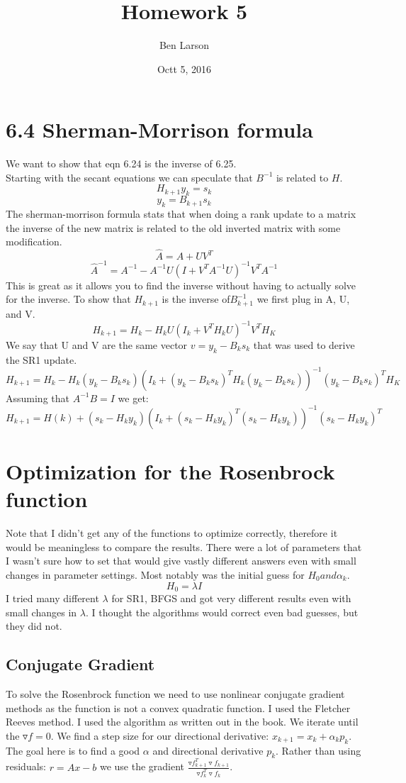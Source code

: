 \documentclass[7pt]{article}
\author{Ben Larson}
\title{Homework 5 }
\date{Octt 5, 2016}
\begin{document}
	\maketitle
	\section{6.4 Sherman-Morrison formula}
	We want to show that eqn 6.24 is the inverse of 6.25.\\
	Starting with the secant equations we can speculate that $B^{-1}$ is related to $ H$. 
	$$ H_{k+1}y_k=s_k $$
	$$ y_k = B_{k+1}s_k$$The sherman-morrison formula stats that when doing a rank update to a matrix the inverse of the new matrix is related to the old inverted matrix with some modification.
	$$\hat{A} = A+UV^T $$
	$$ \hat{A}^{-1} = A^{-1}-A^{-1}U(I+V^TA^{-1}U)^{-1}V^TA^{-1} $$
	 This is great as it allows you to find the inverse without having to actually solve for the inverse.  To show that $H_{k+1} $ is the inverse of$ B^{-1}_{k+1}$ we first plug in A, U, and V. 
	 $$ H_{k+1} = H_k -H_kU(I_k+V^TH_kU)^{-1}V^TH_K$$
	 We say that U and V are the same vector $v=y_k-B_ks_k$ that was used to derive the SR1 update. 
	 $$ H_{k+1} = H_k -H_k(y_k-B_ks_k)(I_k+(y_k-B_ks_k)^TH_k(y_k-B_ks_k))^{-1}(y_k-B_ks_k)^TH_K$$
	 Assuming that $A^{-1}B = I$ we get: 
	 $$ H_{k+1}=H(k)+(s_k-H_ky_k)(I_k+(s_k-H_ky_k)^T(s_k-H_ky_k))^{-1}(s_k-H_ky_k)^T $$

	\section{Optimization for the Rosenbrock function}
	Note that I didn't get any of the functions to optimize correctly, therefore it would be meaningless to compare the results. There were a lot of parameters that I wasn't sure how to set that would give vastly different answers even with small changes in parameter settings. Most notably was the initial guess for $H_0 and \alpha_k$.
	$$ H_0 =\lambda I$$
	I tried many different $\lambda$ for SR1, BFGS and got very different results even with small changes in $\lambda$. I thought the algorithms would correct even bad guesses, but they did not. 
	\subsection{Conjugate Gradient}
	To solve the Rosenbrock function we need to use nonlinear conjugate gradient methods as the function is not a convex quadratic function. I used the Fletcher Reeves method. I used the algorithm as written out in the book. We iterate until the $\triangledown f = 0$. We find a step size for our directional derivative: $x_{k+1} = x_k + \alpha_k p_k$. The goal here is to find a good $\alpha$ and directional derivative $p_k$. Rather than using residuals: $r = Ax-b$ we use the gradient $\frac{\triangledown f_{k+1}^T\triangledown f_{k+1}}{\triangledown f_{k}^T\triangledown f_{k}}$. \\
	
\end{document}
